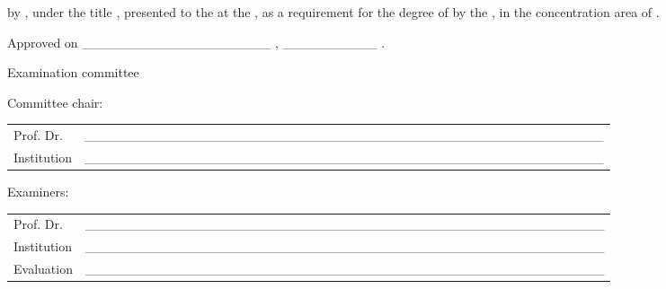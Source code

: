 
\begin{folhadeaprovacao}[\folhadeaprovacaoname]
{\imprimirtipotrabalho} by {\imprimirautor}, under the title \textbf{\imprimirtitulo}, presented to the {\imprimirescola} at the {\imprimiruniversidade}, as a requirement for the degree of {\imprimirtituloacademico} by the {\imprimirprograma}, in the concentration area of {\imprimirareadeconcentracao}.

\vspace{\hugeskipamount}
Approved on \_\_\_\_\_\_\_\_\_\_\_\_\_\_\_\_\_\_\_\_ , \_\_\_\_\_\_\_\_\_\_ .

\vspace{\hugeskipamount}
\begin{center}
  Examination committee
\end{center}

\vspace{\smallskipamount}
Committee chair:

\vspace{\tinyskipamount}
\begingroup


\setlength{\arrayrulewidth}{0pt}
\setlength{\tabcolsep}{0cm}
\begin{tabular}{m{2cm} P{14cm}}
  Prof. Dr. & \_\_\_\_\_\_\_\_\_\_\_\_\_\_\_\_\_\_\_\_\_\_\_\_\_\_\_\_\_\_\_\_\_\_\_\_\_\_\_\_\_\_\_\_\_\_\_\_\_\_\_\_\_\_\_ \\
  Institution & \_\_\_\_\_\_\_\_\_\_\_\_\_\_\_\_\_\_\_\_\_\_\_\_\_\_\_\_\_\_\_\_\_\_\_\_\_\_\_\_\_\_\_\_\_\_\_\_\_\_\_\_\_\_\_ \\
\end{tabular}

\vspace{\bigskipamount}
Examiners:

\vspace{\tinyskipamount}
\begin{tabular}{m{2cm} P{14cm}}
  Prof. Dr. & \_\_\_\_\_\_\_\_\_\_\_\_\_\_\_\_\_\_\_\_\_\_\_\_\_\_\_\_\_\_\_\_\_\_\_\_\_\_\_\_\_\_\_\_\_\_\_\_\_\_\_\_\_\_\_ \\
  Institution & \_\_\_\_\_\_\_\_\_\_\_\_\_\_\_\_\_\_\_\_\_\_\_\_\_\_\_\_\_\_\_\_\_\_\_\_\_\_\_\_\_\_\_\_\_\_\_\_\_\_\_\_\_\_\_ \\
  Evaluation & \_\_\_\_\_\_\_\_\_\_\_\_\_\_\_\_\_\_\_\_\_\_\_\_\_\_\_\_\_\_\_\_\_\_\_\_\_\_\_\_\_\_\_\_\_\_\_\_\_\_\_\_\_\_\_ \\
\end{tabular}


\end{folhadeaprovacao}
